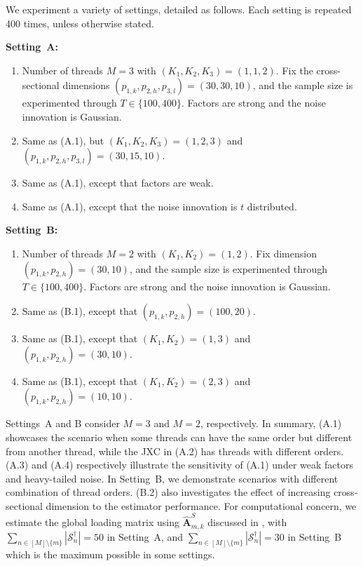 \documentclass[aos]{imsart}
\theoremstyle{plain}
\theoremstyle{definition}
\def\wh#1{\widehat{#1}}
\def\cS{\mathcal{S}}
\def\bA{\mathbf{A}}
\begin{document}
We experiment a variety of settings, detailed as follows. Each setting is repeated 400 times, unless otherwise stated.

\vspace{12pt}
\noindent\textbf{Setting~A:}
\begin{enumerate}[itemsep=-1pt, parsep=0pt, topsep=0pt, label = (A.\arabic*), left=1pt]
    \item Number of threads $M=3$ with $(K_1,K_2,K_3)=(1,1,2)$. Fix the cross-sectional dimensions $(p_{1,k}, p_{2,h}, p_{3,l}) =(30, 30, 10)$, and the sample size is experimented through $T\in\{100, 400\}$. Factors are strong and the noise innovation is Gaussian.
    \item Same as (A.1), but $(K_1,K_2,K_3)=(1,2,3)$ and $(p_{1,k}, p_{2,h}, p_{3,l}) =(30, 15, 10)$.
    \item Same as (A.1), except that factors are weak.
    \item Same as (A.1), except that the noise innovation is $t$ distributed.
\end{enumerate}
\vspace{12pt}

\noindent\textbf{Setting~B:}
\begin{enumerate}[itemsep=-1pt, parsep=0pt, topsep=0pt, label = (B.\arabic*), left=1pt]
    \item Number of threads $M=2$ with $(K_1,K_2)=(1,2)$. Fix dimension $(p_{1,k}, p_{2,h}) =(30, 10)$, and the sample size is experimented through $T\in\{100, 400\}$. Factors are strong and the noise innovation is Gaussian.
    \item Same as (B.1), except that $(p_{1,k}, p_{2,h}) =(100, 20)$.
    \item Same as (B.1), except that $(K_1,K_2)=(1,3)$ and $(p_{1,k}, p_{2,h}) =(30, 10)$.
    \item Same as (B.1), except that $(K_1,K_2)=(2,3)$ and $(p_{1,k}, p_{2,h}) =(10, 10)$.
\end{enumerate}
\vspace{12pt}


Settings~A and B consider $M=3$ and $M=2$, respectively. In summary, (A.1) showcases the scenario when some threads can have the same order but different from another thread, while the JXC in (A.2) has threads with different orders. (A.3) and (A.4) respectively illustrate the sensitivity of (A.1) under weak factors and heavy-tailed noise. In Setting~B, we demonstrate scenarios with different combination of thread orders. (B.2) also investigates the effect of increasing cross-sectional dimension to the estimator performance.
For computational concern, we estimate the global loading matrix using $\wh{\bA}_{m,k}^S$ discussed in , with $\sum_{n\in[M] \setminus\{m\}}|\cS_n^\dagger| =50$ in Setting~A, and $\sum_{n\in[M] \setminus\{m\}}|\cS_n^\dagger| =30$ in Setting~B which is the maximum possible in some settings.
\end{document}
